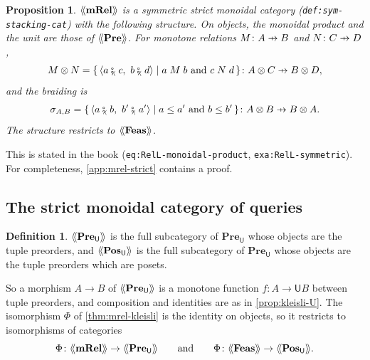 \documentclass[11pt,a4paper]{article}
\theoremstyle{plain}
\newtheorem{proposition}[theorem]{Proposition}
\theoremstyle{definition}
\newtheorem{definition}[theorem]{Definition}
\theoremstyle{remark}
\newcommand{\Cat}[1]{\mathbf{#1}}
\newcommand{\Pre}{\Cat{Pre}}
\newcommand{\Pos}{\Cat{Pos}}
\newcommand{\mRel}{\Cat{mRel}}
\newcommand{\Feas}{\Cat{Feas}}
\newcommand{\U}{\mathsf{U}}
\newcommand{\PreU}{\Pre_{\U}}
\newcommand{\PosU}{\Pos_{\U}}
\providecommand{\llangle}{\mathopen{\langle\mkern-3.5mu\langle}}
\providecommand{\rrangle}{\mathclose{\rangle\mkern-3.5mu\rangle}}
\newcommand{\tL}[1]{\llangle #1 \rrangle}
\newcommand{\tc}{\mathbin{\fatsemi_{\!\scriptscriptstyle\langle}}}
\newcommand{\tup}[1]{\langle #1 \rangle}
\newcommand{\profto}{\mathrel{\ooalign{\hfil$\mapstochar\mkern 5mu$\hfil\cr$\to$\cr}}}
\newcommand{\rel}[3]{#1 \mathrel{#2} #3}
\newcommand{\lbl}[1]{\nolinkurl{#1}}
\begin{document}
\begin{proposition}
    \label{prop:mRelL}
    $\tL{\mRel}$ is a symmetric strict monoidal category (\lbl{def:sym-stacking-cat}) with the following structure.
    On objects, the monoidal product and the unit are those of $\tL{\Pre}$.
    For monotone relations $M \colon A \profto B$ and $N \colon C \profto D$,
    \begin{equation}
        \label{eq:mRelL-product}
        M \otimes N = \{\, \tup{a \tc c,\ b \tc d} \mid \rel{a}{M}{b} \text{ and } \rel{c}{N}{d} \,\} \colon A \otimes C \profto B \otimes D,
    \end{equation}
    and the braiding is
    \begin{equation}
        \label{eq:mRelL-braiding}
        \sigma_{A,B} = \{\, \tup{a \tc b,\ b' \tc a'} \mid a \leq a' \text{ and } b \leq b' \,\} \colon A \otimes B \profto B \otimes A.
    \end{equation}
    The structure restricts to $\tL{\Feas}$.
\end{proposition}

This is stated in the book (\lbl{eq:RelL-monoidal-product}, \lbl{exa:RelL-symmetric}).
For completeness, \cref{app:mrel-strict} contains a proof.

\subsection{The strict monoidal category of queries}

\begin{definition}
    \label{def:PreUL}
    $\tL{\PreU}$ is the full subcategory of $\PreU$ whose objects are the tuple preorders, and $\tL{\PosU}$ is the full subcategory of $\PreU$ whose objects are the tuple preorders which are posets.
\end{definition}

So a morphism $A \to B$ of $\tL{\PreU}$ is a monotone function $f \colon A \to \U B$ between tuple preorders, and composition and identities are as in \cref{prop:kleisli-U}.
The isomorphism $\Phi$ of \cref{thm:mrel-kleisli} is the identity on objects, so it restricts to isomorphisms of categories
\begin{equation*}
    \Phi \colon \tL{\mRel} \to \tL{\PreU}
    \qquad \text{and} \qquad
    \Phi \colon \tL{\Feas} \to \tL{\PosU}.
\end{equation*}
\end{document}

